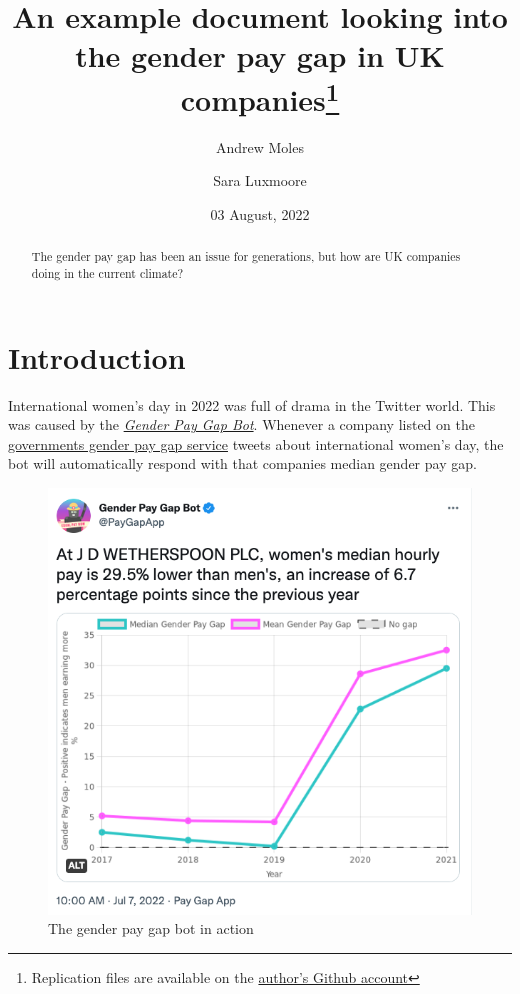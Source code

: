 \documentclass[
  11pt,
]{article}
\title{An example document looking into the gender pay gap in UK
companies\thanks{Replication files are available on the
\href{https://github.com/andrewmoles2/gender_pay_gap_example}{author's
Github account}}}
\author{Andrew Moles \and Sara Luxmoore}
\date{03 August, 2022}
\begin{document}
\maketitle
\begin{abstract}
The gender pay gap has been an issue for generations, but how are UK
companies doing in the current climate?
\end{abstract}

\newpage

\raggedright
\newpage
\setcounter{tocdepth}{4}
\tableofcontents
\listoffigures
\listoftables

\newpage

\hypertarget{introduction}{%
\section{Introduction}\label{introduction}}

International women's day in 2022 was full of drama in the Twitter
world. This was caused by the
\href{https://genderpaygap.app/}{\emph{Gender Pay Gap Bot}}. Whenever a
company listed on the
\href{https://gender-pay-gap.service.gov.uk/}{governments gender pay gap
service} tweets about international women's day, the bot will
automatically respond with that companies median gender pay gap.

\begin{figure}

{\centering \includegraphics[width=0.7\linewidth]{pay_gap_bot} 

}

\caption{The gender pay gap bot in action}\label{fig:botimage}
\end{figure}
\end{document}
